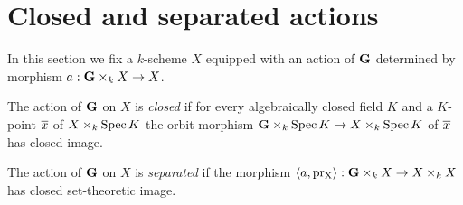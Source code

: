 \section{Closed and separated actions}
\noindent
In this section we fix a $k$-scheme $X$ equipped with an action of $\mathbf{G}$ determined by morphism $a:\mathbf{G}\times_kX\rightarrow X$.

\begin{definition}
The action of $\mathbf{G}$ on $X$ is \textit{closed} if for every algebraically closed field $K$ and a $K$-point $\overline{x}$ of $X\times_k\mathrm{Spec}\, K$ the orbit morphism $\mathbf{G}\times_k\mathrm{Spec}\, K\rightarrow X\times_k\mathrm{Spec}\, K$ of $\overline{x}$ has closed image.
\end{definition}

\begin{definition}
The action of $\mathbf{G}$ on $X$ is \textit{separated} if the morphism $\langle a, \mathrm{pr_X} \rangle:\mathbf{G}\times_kX\rightarrow X\times_kX$ has closed set-theoretic image.
\end{definition}

